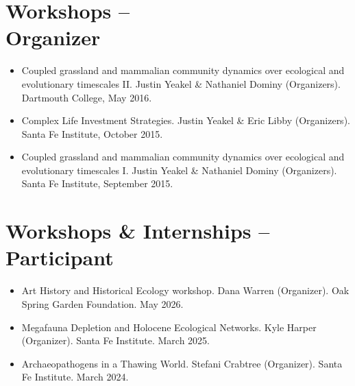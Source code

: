 \documentclass[margin,line,12pt]{res}
\begin{document}
\begin{resume}
\begin{enumerate}
\end{enumerate}

%
%


\section{\sc Workshops -- \\ Organizer}
\begin{itemize}
\item Coupled grassland and mammalian community dynamics over ecological and evolutionary timescales II. Justin Yeakel \& Nathaniel Dominy (Organizers). Dartmouth College, May 2016.

\item Complex Life Investment Strategies. Justin Yeakel \& Eric Libby (Organizers). Santa Fe Institute, October 2015.

\item Coupled grassland and mammalian community dynamics over ecological and evolutionary timescales I. Justin Yeakel \& Nathaniel Dominy (Organizers). Santa Fe Institute, September 2015.
\end{itemize}


\section{\sc Workshops \& Internships -- \\ Participant}
\begin{itemize}

\item Art History and Historical Ecology workshop. Dana Warren (Organizer). Oak Spring Garden Foundation. May 2026.

\item Megafauna Depletion and Holocene Ecological Networks. Kyle Harper (Organizer). Santa Fe Institute. March 2025.

\item Archaeopathogens in a Thawing World. Stefani Crabtree (Organizer). Santa Fe Institute. March 2024.


\end{itemize}
\end{resume}
\end{document}
